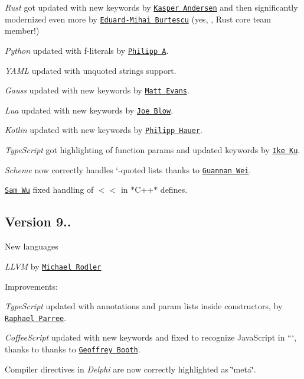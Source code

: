 \begin{DoxyItemize}
\item {\itshape Rust} got updated with new keywords by \href{https://github.com/kasma1990}{\tt Kasper Andersen} and then significantly modernized even more by \href{https://github.com/eddyb}{\tt Eduard-\/\+Mihai Burtescu} (yes, , Rust core team member!)
\item {\itshape Python} updated with f-\/literals by \href{https://github.com/flying-sheep}{\tt Philipp A}.
\item {\itshape Y\+A\+ML} updated with unquoted strings support.
\item {\itshape Gauss} updated with new keywords by \href{https://github.com/matthewevans}{\tt Matt Evans}.
\item {\itshape Lua} updated with new keywords by \href{https://github.com/mossarelli}{\tt Joe Blow}.
\item {\itshape Kotlin} updated with new keywords by \href{https://github.com/phauer}{\tt Philipp Hauer}.
\item {\itshape Type\+Script} got highlighting of function params and updated keywords by \href{https://github.com/dempfi}{\tt Ike Ku}.
\item {\itshape Scheme} now correctly handles `-\/quoted lists thanks to \href{https://github.com/Kraks}{\tt Guannan Wei}.
\item \href{https://github.com/samsam2310}{\tt Sam Wu} fixed handling of {\ttfamily $<$$<$} in $\ast$\+C++$\ast$ defines.
\end{DoxyItemize}

\subsection*{Version 9..}

New languages


\begin{DoxyItemize}
\item {\itshape L\+L\+VM} by \href{https://github.com/f0rki}{\tt Michael Rodler}
\end{DoxyItemize}

Improvements\+:


\begin{DoxyItemize}
\item {\itshape Type\+Script} updated with annotations and param lists inside constructors, by \href{https://github.com/rparree}{\tt Raphael Parree}.
\item {\itshape Coffee\+Script} updated with new keywords and fixed to recognize Java\+Script in ```, thanks to thanks to \href{https://github.com/GeoffreyBooth}{\tt Geoffrey Booth}.
\item Compiler directives in {\itshape Delphi} are now correctly highlighted as \char`\"{}meta\char`\"{}.
\end{DoxyItemize}

